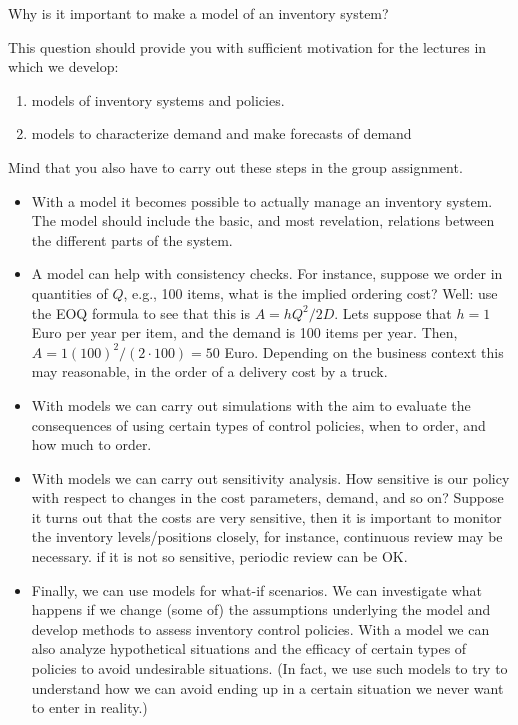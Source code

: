 \begin{question}
  Why is it important to make a model of an inventory system?


  This question should provide you with sufficient motivation for the
  lectures in which we develop:
\begin{enumerate}
 \item models of inventory systems  and policies. 
 \item models to characterize demand and make forecasts of demand
\end{enumerate}
Mind that you also have to carry out these steps in the group
assignment.

  \begin{solution}
    \begin{itemize}
    \item With a model it becomes possible to actually manage an
      inventory system. The model should include the basic, and most
      revelation, relations between the different parts of the system.
    \item A model can help with consistency checks. For instance,
      suppose we order in quantities of $Q$, e.g., 100 items, what is
      the implied ordering cost?  Well: use the EOQ formula to see
      that this is $A=hQ^2/2D$.  Lets suppose that $h=1$ Euro per year
      per item, and the demand is 100 items per year. Then,
      $A=1(100)^2/(2\cdot 100) = 50$ Euro. Depending on the business
      context this may reasonable, in the order of a delivery cost by
      a truck.
    \item With models we can carry out simulations with the aim to
      evaluate the consequences of using certain types of control
      policies, when to order, and how much to order.
    \item With models we can carry out sensitivity analysis. How
      sensitive is our policy with respect to changes in the cost
      parameters, demand, and so on? Suppose it turns out that the
      costs are very sensitive, then it is important to monitor the
      inventory levels/positions closely, for instance, continuous
      review may be necessary. if it is not so sensitive, periodic
      review can be OK.
    \item Finally, we can use models for what-if scenarios.  We can
      investigate what happens if we change (some of) the assumptions
      underlying the model and develop methods to assess inventory
      control policies. With a model we can also analyze hypothetical
      situations and the efficacy of certain types of policies to
      avoid undesirable situations. (In fact, we use such models to
      try to understand how we can avoid ending up in a certain
      situation we never want to enter in reality.)
    \end{itemize}
  \end{solution}
\end{question}



